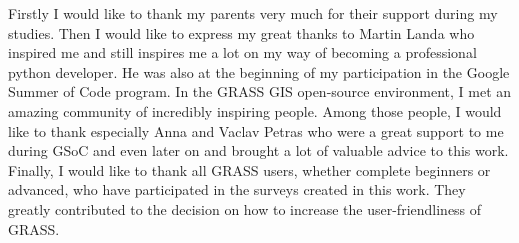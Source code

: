 \documentclass[a4paper,10pt,twoside]{article}
\begin{document}
Firstly I would like to thank my parents very much for their support during my studies. Then I would like to express my great thanks to Martin Landa who inspired me and still inspires me a lot on my way of becoming a professional python developer. He was also at the beginning of my participation in the Google Summer of Code program. In the GRASS GIS open-source environment, I met an amazing community of incredibly inspiring people. Among those people, I would like to thank especially Anna and Vaclav Petras who were a great support to me during GSoC and even later on and brought a lot of valuable advice to this work. Finally, I would like to thank all GRASS users, whether complete beginners or advanced, who have participated in the surveys created in this work. They greatly contributed to the decision on how to increase the user-friendliness of GRASS.


\newpage ~ \newpage
\thispagestyle{empty}


\newpage

\tableofcontents %
\newpage
\listoffigures %

\thispagestyle{empty}
\newcommand{\obrazek}[1]{(viz obr. \ref{#1})} %

\newpage
\pagestyle{fancy}


\renewcommand{\sectionmark}[1]{\markright{\ #1}}

\fancyhf{} %
\renewcommand{\headrulewidth}{0.4pt} %
\renewcommand{\footrulewidth}{0.4pt}  %
\addtolength{\voffset}{-0.4cm}

\fancyhead[RE, RO]{\nouppercase{\rightmark}}
   
\fancyfoot[RO, LE]{{\textsc{\small \thepage}}}

\fancypagestyle{plain}{
  \fancyhead{} %
  \renewcommand{\headrulewidth}{0pt} %
}
\end{document}
